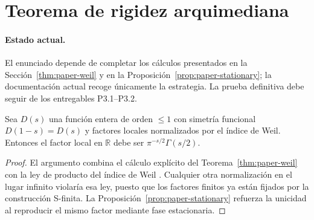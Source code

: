\section{Teorema de rigidez arquimediana}

\paragraph{Estado actual.}
El enunciado depende de completar los cálculos presentados en la
Sección~\ref{thm:paper-weil} y en la Proposición~\ref{prop:paper-stationary}; la
documentación actual recoge únicamente la estrategia.  La prueba definitiva debe
seguir de los entregables P3.1--P3.2.

\begin{theorem}
Sea $D(s)$ una función entera de orden $\leqslant 1$ con simetría funcional
$D(1-s)=D(s)$ y factores locales normalizados por el índice de Weil.
Entonces el factor local en $\mathbb{R}$ debe ser $\pi^{-s/2}\Gamma(s/2)$.
\end{theorem}

\begin{proof}
El argumento combina el cálculo explícito del Teorema~\ref{thm:paper-weil} con la
ley de producto del índice de Weil \cite[Cor.~2]{Weil1964}.  Cualquier otra
normalización en el lugar infinito violaría esa ley, puesto que los factores
finitos ya están fijados por la construcción S-finita.  La
Proposición~\ref{prop:paper-stationary} refuerza la unicidad al reproducir el
mismo factor mediante fase estacionaria.
\end{proof}
